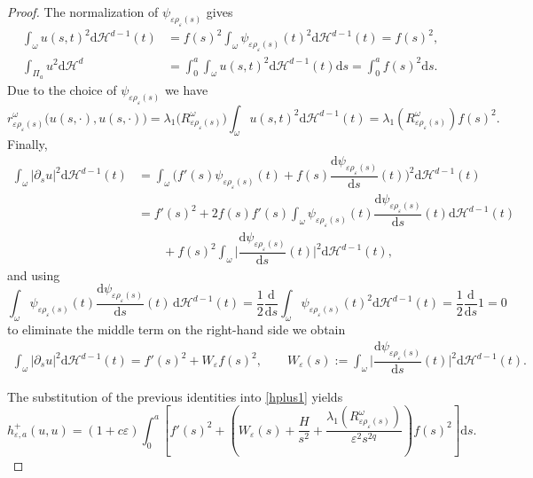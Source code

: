 \documentclass[11pt,oneside,reqno,a4paper]{amsart}
\newcommand{\dd}{\mathrm{d}}
\renewcommand{\H}{\mathcal{H}}
\newcommand{\eps}{\varepsilon}
\theoremstyle{definition}
\begin{document}
\begin{proof}
The normalization of $\psi_{\eps\rho_\eps(s)}$ gives
\begin{align*}
	\int_\omega u(s,t)^2\dd \H^{d-1}(t)&=f(s)^2\int_\omega \psi_{\eps\rho_\eps(s)}(t)^2\dd \H^{d-1}(t)=f(s)^2,\\
	\int_{\Pi_a}u^2\dd\H^d&=\int_0^a 	\int_\omega u(s,t)^2\dd \H^{d-1}(t)\dd s=\int_0^a f(s)^2\dd s.
\end{align*}
Due to the choice of $\psi_{\eps\rho_\eps(s)}$ we have
\[
r^\omega_{\eps\rho_\eps(s)}\big(u(s,\cdot),u(s,\cdot)\big)=\lambda_1\big(R^\omega_{\eps\rho_\eps(s)}\big)
\int_\omega u(s,t)^2\dd \H^{d-1}(t)= \lambda_1(R^\omega_{\eps\rho_\eps(s)})f(s)^2.
\]
Finally,
\begin{align*}
\int_\omega |\partial_s u|^2\dd\H^{d-1}(t)&=
\int_\omega \Big( f'(s)\psi_{\eps \rho_\eps(s)}(t)+f(s)\dfrac{\dd \psi_{\eps\rho_\eps(s)}}{\dd s}(t)\Big)^2\dd\H^{d-1}(t)\\
&=f'(s)^2+2f(s)f'(s)\int_\omega \psi_{\eps \rho_\eps(s)}(t)\dfrac{\dd \psi_{\eps\rho_\eps(s)}}{\dd s}(t)\dd\H^{d-1}(t)\\
&\qquad+f(s)^2\int_\omega \Big|\dfrac{\dd \psi_{\eps\rho_\eps(s)}}{\dd s}(t)\Big|^2\dd\H^{d-1}(t),
\end{align*}
and using 
\[
\int_\omega \psi_{\eps \rho_\eps(s)}(t)\dfrac{\dd \psi_{\eps\rho_\eps(s)}}{\dd s}(t)\,\dd\H^{d-1}(t)
=\dfrac{1}{2}\dfrac{\dd}{\dd s}\int_\omega \psi_{\eps \rho_\eps(s)}(t)^2\dd\H^{d-1}(t)
=\dfrac{1}{2}\dfrac{\dd}{\dd s} 1=0
\]
to eliminate the middle term on the right-hand side
we obtain
\begin{gather*}
\int_\omega |\partial_s u|^2\dd\H^{d-1}(t)=f'(s)^2+W_\eps f(s)^2,\qquad
W_\eps(s):=	\int_\omega \Big|\dfrac{\dd \psi_{\eps\rho_\eps(s)}}{\dd s}(t)\Big|^2\dd\H^{d-1}(t).
\end{gather*}

The substitution of the previous identities into \eqref{hplus1} yields
\begin{equation}
	\label{hplus2}
h^+_{\eps,a}(u,u)=(1+c\eps)\int_0^a \left[f'(s)^2 +\left(W_\eps(s)+\dfrac{H}{s^2} +\dfrac{\lambda_1\left(R^\omega_{\eps\rho_\eps(s)}\right)}{\eps^2 s^{2q}}\right) f(s)^2\right]\dd s.
\end{equation}


\end{proof}
\end{document}
